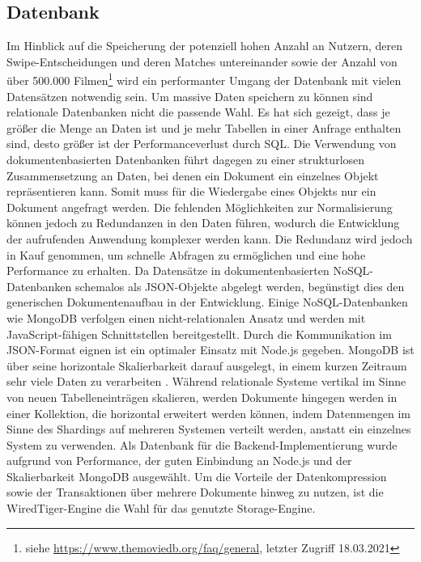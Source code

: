 \subsection{Datenbank}
Im Hinblick auf die Speicherung der potenziell hohen Anzahl an Nutzern, deren Swipe-Ent\-schei\-dungen und deren Matches untereinander sowie der Anzahl von über 500.000 Filmen\footnote{siehe \url{https://www.themoviedb.org/faq/general}, letzter Zugriff 18.03.2021} wird ein performanter Umgang der Datenbank mit vielen Datensätzen notwendig sein.  
Um massive Daten speichern zu können sind relationale Datenbanken nicht die passende Wahl. 
Es hat sich gezeigt, dass je größer die Menge an Daten ist und je mehr Tabellen in einer Anfrage enthalten sind, desto größer ist der Performanceverlust durch SQL. \cite{4.5}
\newline
Die Verwendung von dokumentenbasierten Datenbanken führt dagegen zu einer strukturlosen Zusammensetzung an Daten, bei denen ein Dokument ein einzelnes Objekt repräsentieren kann. 
Somit muss für die Wiedergabe eines Objekts nur ein Dokument angefragt werden. Die fehlenden Möglichkeiten zur Normalisierung können jedoch zu Redundanzen in den Daten führen, wodurch die Entwicklung der aufrufenden Anwendung komplexer werden kann. 
Die Redundanz wird jedoch in Kauf genommen, um schnelle Abfragen zu ermöglichen und eine hohe Performance zu erhalten. Da Datensätze in dokumentenbasierten NoSQL-Datenbanken schemalos als JSON-Objekte abgelegt werden, begünstigt dies den generischen Dokumentenaufbau in der Entwicklung.
\newline
Einige NoSQL-Datenbanken wie MongoDB verfolgen einen nicht-relationalen Ansatz und werden mit JavaScript-fähigen Schnittstellen bereitgestellt. Durch die Kommunikation im JSON-Format eignen ist ein optimaler Einsatz mit Node.js gegeben. MongoDB ist über seine horizontale Skalierbarkeit darauf ausgelegt, in einem kurzen Zeitraum sehr viele Daten zu verarbeiten \cite{Tech6}. Während relationale Systeme vertikal im Sinne von neuen Tabelleneinträgen skalieren, werden Dokumente hingegen werden in einer Kollektion, die horizontal erweitert werden können, indem Datenmengen im Sinne des Shardings auf mehreren Systemen verteilt werden, anstatt ein einzelnes System zu verwenden.
\newline
Als Datenbank für die Backend-Implementierung wurde aufgrund von Performance, der guten Einbindung an Node.js und der Skalierbarkeit MongoDB ausgewählt. Um die Vorteile der Da\-ten\-kompression sowie der Transaktionen über mehrere Dokumente hinweg zu nutzen, ist die WiredTiger-Engine die Wahl für das genutzte Storage-Engine.  


